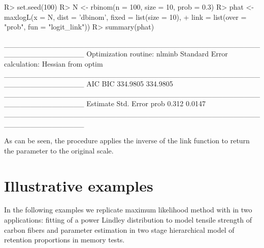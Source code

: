 \documentclass[nojss]{jss}
\begin{document}
\begin{Schunk}
\begin{Sinput}
R> set.seed(100)
R> N <- rbinom(n = 100, size = 10, prob = 0.3)
R> phat <- maxlogL(x = N, dist = 'dbinom', fixed = list(size = 10),
+                  link = list(over = "prob", fun = "logit_link"))
R> summary(phat)
\end{Sinput}
\begin{Soutput}
_______________________________________________________________
Optimization routine: nlminb 
Standard Error calculation: Hessian from optim 
_______________________________________________________________
       AIC      BIC
  334.9805 334.9805
_______________________________________________________________
     Estimate  Std. Error
prob     0.312     0.0147
_______________________________________________________________
\end{Soutput}
\end{Schunk}

As can be seen, the procedure applies the inverse of the link function to return the parameter to the original scale.



\section{Illustrative examples} \label{sec:illustrations}

In the following examples we replicate maximum likelihood method with  in two applications: fitting of a power Lindley distribution to model tensile strength of carbon fibers and parameter estimation in two stage hierarchical model of retention proportions in memory tests.
\end{document}
